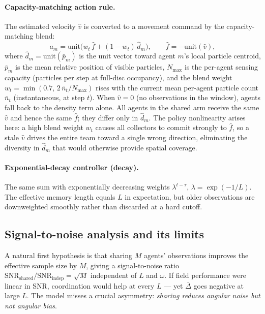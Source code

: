 \documentclass[sigconf,anonymous]{aamas}
\newcommand{\Dbar}{\bar{\Delta}}
\begin{document}
\paragraph{Capacity-matching action rule.}
The estimated velocity $\hat{v}$ is converted to a movement
command by the capacity-matching blend:
\begin{equation}
  a_m = \mathrm{unit}\!\bigl(w_t\,\hat{f} + (1-w_t)\,\hat{d}_m\bigr),
  \qquad
  \hat{f} = -\mathrm{unit}(\hat{v}),
  \label{eq:action}
\end{equation}
where $\hat{d}_m = \mathrm{unit}(\bar{p}_m)$ is the unit vector toward
agent $m$'s local particle centroid, $\bar{p}_m$ is the mean relative
position of visible particles, $N_{\max}$ is the per-agent sensing
capacity (particles per step at full-disc occupancy), and the blend
weight $w_t = \min(0.7,\,2\,\bar{n}_t/N_{\max})$ rises with the current
mean per-agent particle count $\bar{n}_t$ (instantaneous, at step $t$).
When $\hat{v}{=}0$ (no observations in the window), agents fall back
to the density term alone.
All agents in the shared arm receive the same $\hat{v}$ and hence
the same $\hat{f}$; they differ only in $\hat{d}_m$.  The policy
nonlinearity arises here: a high blend weight $w_t$ causes all
collectors to commit strongly to $\hat{f}$, so a stale $\hat{v}$
drives the entire team toward a single wrong direction, eliminating
the diversity in $\hat{d}_m$ that would otherwise provide spatial
coverage.

\paragraph{Exponential-decay controller (decay).}
The same sum with exponentially decreasing weights
$\lambda^{t - \tau}$, $\lambda{=}\exp(-1/L)$. The effective
memory length equals $L$ in expectation, but older observations
are downweighted smoothly rather than discarded at a hard cutoff.

\subsection{Signal-to-noise analysis and its limits}
\label{sec:theory-fail}

A natural first hypothesis is that sharing $M$ agents' observations
improves the effective sample size by $M$, giving a
signal-to-noise ratio
$\mathrm{SNR}_{\mathrm{shared}}/\mathrm{SNR}_{\mathrm{indep}} = \sqrt{M}$
independent of $L$ and $\omega$.  If field performance were linear
in SNR, coordination would help at every $L$ — yet $\Dbar$ goes
negative at large $L$.  The model misses a crucial asymmetry:
\emph{sharing reduces angular noise but not angular bias}.
\end{document}
